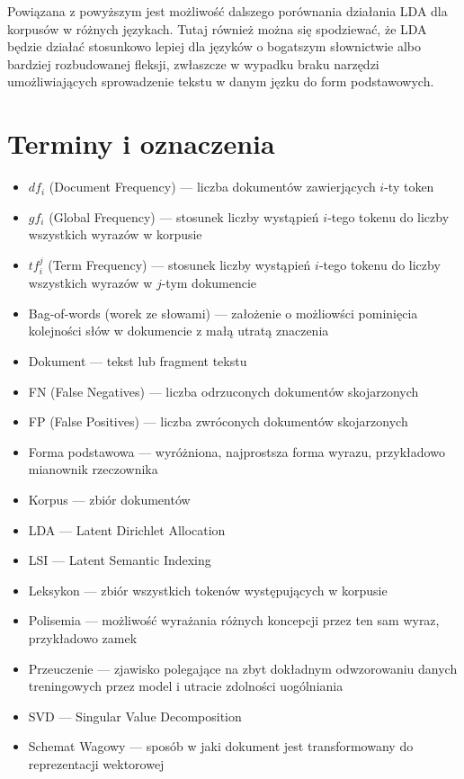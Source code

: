 \documentclass[11pt,a4paper]{article}
\begin{document}
Powiązana z powyższym jest możliwość dalszego porównania działania LDA dla
korpusów w różnych językach. Tutaj również można się spodziewać, że LDA będzie
działać stosunkowo lepiej dla języków o bogatszym słownictwie albo bardziej
rozbudowanej fleksji, zwłaszcze w wypadku braku narzędzi umożliwiających
sprowadzenie tekstu w danym jęzku do form podstawowych.

\label{sec:summary}
\pagebreak

\appendix
\section{Terminy i oznaczenia}
\label{sec:terms}

\begin{itemize}
\item $df_i$ (Document Frequency) --- liczba dokumentów zawierjących $i$-ty token
\item $gf_i$ (Global Frequency) --- stosunek liczby wystąpień $i$-tego tokenu do liczby wszystkich wyrazów w korpusie
\item $tf_i^j$ (Term Frequency) --- stosunek liczby wystąpień $i$-tego tokenu do liczby wszystkich wyrazów w $j$-tym dokumencie
\item Bag-of-words (worek ze słowami) --- założenie o możliowści pominięcia kolejności słów w dokumencie z małą utratą znaczenia
\item Dokument --- tekst lub fragment tekstu
\item FN (False Negatives) --- liczba odrzuconych dokumentów skojarzonych
\item FP (False Positives) --- liczba zwróconych dokumentów skojarzonych
\item Forma podstawowa --- wyróżniona, najprostsza forma wyrazu, przykładowo mianownik rzeczownika
\item Korpus --- zbiór dokumentów
\item LDA --- Latent Dirichlet Allocation
\item LSI --- Latent Semantic Indexing
\item Leksykon --- zbiór wszystkich tokenów występujących w korpusie
\item Polisemia --- możliwość wyrażania różnych koncepcji przez ten sam wyraz, przykładowo zamek
\item Przeuczenie --- zjawisko polegające na zbyt dokładnym odwzorowaniu danych treningowych przez model i utracie zdolności uogólniania
\item SVD --- Singular Value Decomposition
\item Schemat Wagowy --- sposób w jaki dokument jest transformowany do reprezentacji wektorowej

\end{itemize}
\end{document}
